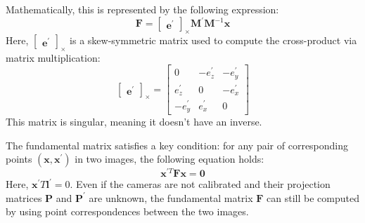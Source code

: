 Mathematically, this is represented by the following expression:
\[\mathbf{F}=\begin{bmatrix}
    \mathbf{e}^\prime
\end{bmatrix}_{\times}\mathbf{M}^\prime\mathbf{M}^{-1}\mathbf{x}\]
Here, $\begin{bmatrix} \mathbf{e}^\prime \end{bmatrix}_{\times}$ is a skew-symmetric matrix used to compute the cross-product via matrix multiplication:
\[\begin{bmatrix} \mathbf{e}^\prime \end{bmatrix}_{\times}=\begin{bmatrix} 0 & -e^\prime_z & -e^\prime_y \\ e^\prime_z & 0 & -e^\prime_x \\ -e^\prime_y & e^\prime_x & 0 \end{bmatrix}\]
This matrix is singular, meaning it doesn't have an inverse.

The fundamental matrix satisfies a key condition: for any pair of corresponding points $(\mathbf{x},\mathbf{x}^\prime)$ in two images, the following equation holds:
\[\mathbf{x}^{\prime T}\mathbf{F}\mathbf{x}=\mathbf{0}\]
Here, $\mathbf{x}^\prime T\mathbf{l}^\prime=0$.
Even if the cameras are not calibrated and their projection matrices $\mathbf{P}$ and $\mathbf{P}^\prime$ are unknown, the fundamental matrix $\mathbf{F}$ can still be computed by using point correspondences between the two images.

